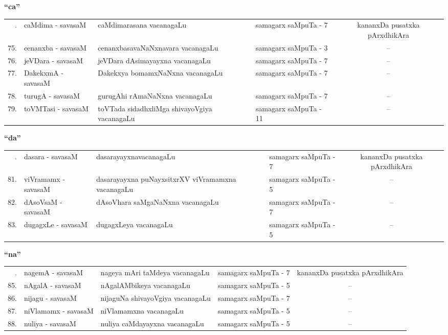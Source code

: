 \centerline{\bf ``ca''}

{\renewcommand{\arraystretch}{1.3}
\begin{longtable}{rl>{\raggedright}p{5.5cm}lc}
\hline
\endfirsthead
\hline
\endhead
\hline
\endfoot
\endlastfoot
74. &   caMdima - savasaM &  caMdimarasana vacanagaLu & samagarx saMpuTa - 7  & kananxDa pusatxka pArxdhikAra\\
75. &   cenanxba - savasaM &  cenanxbasavaNaNxnavara vacanagaLu & samagarx saMpuTa - 3 & --\\
76. &   jeVDara - savasaM &  jeVDara dAsimayayxna vacanagaLu & samagarx saMpuTa - 7 & --\\
77. &  DakekxmA - savasaM &  Dakekxya bomamxNaNxna vacanagaLu & samagarx saMpuTa - 7 & --\\
78. &  turugA - savasaM &  gurugAhi rAmaNaNxna vacanagaLu & samagarx saMpuTa - 7 & --\\
79. &  toVMTasi - savasaM & toVTada sidadhxliMga shivayoVgiya vacanagaLu & samagarx saMpuTa - 11 & --\\
\hline
\end{longtable}}

\centerline{\bf ``da''}

{\renewcommand{\arraystretch}{1.3}
\begin{longtable}{rl>{\raggedright}p{5.5cm}lc}
\hline
\endfirsthead
\hline
\endhead
\hline
\endfoot
\endlastfoot
80. &  dasara - savasaM &  dasarayayxnavacanagaLu & samagarx saMpuTa - 7 & kananxDa pusatxka pArxdhikAra\\
81. &  viVramamx - savasaM & dasarayayxna puNayxsitxrXV viVramamxna vacanagaLu & samagarx saMpuTa - 5 & --\\
82. &  dAsoVsaM - savasaM & dAsoVhara saMgaNaNxna vacanagaLu & samagarx saMpuTa - 7 & --\\
83. &  dugagxLe - savasaM & dugagxLeya vacanagaLu & samagarx saMpuTa - 5 & --\\
\hline
\end{longtable}}

\centerline{\bf ``na''}

{\renewcommand{\arraystretch}{1.3}
\begin{longtable}{rl>{\raggedright}p{5.5cm}lc}
\hline
\endfirsthead
\hline
\endhead
\hline
\endfoot
\endlastfoot
84. & nagemA - savasaM &  nageya mAri taMdeya vacanagaLu & samagarx saMpuTa - 7 & kananxDa pusatxka pArxdhikAra\\
85. & nAgalA  - savasaM & nAgalAMbikeya vacanagaLu & samagarx saMpuTa - 5 & --\\
86. & nijagu  - savasaM & nijaguNa shivayoVgiya vacanagaLu & samagarx saMpuTa - 7 & --\\
87. & niVlamamx  - savasaM & niVlamamxna vacanagaLu & samagarx saMpuTa - 5 & --\\
88. & nuliya  - savasaM & nuliya caMdayayxna vacanagaLu & samagarx saMpuTa - 5 & --\\
\hline
\end{longtable}}

